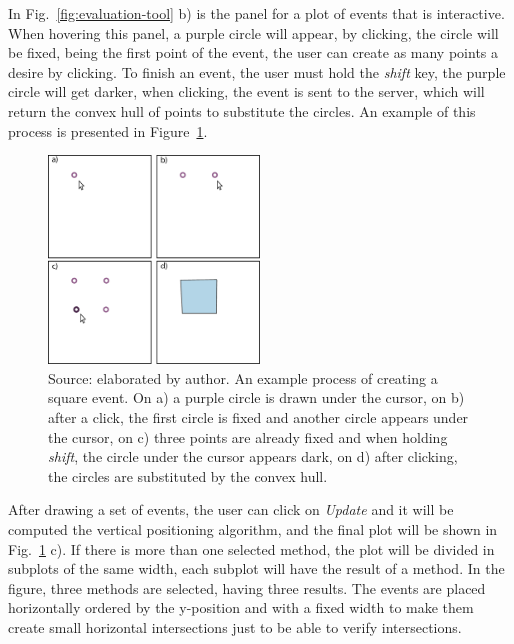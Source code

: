 In Fig.~\ref{fig:evaluation-tool} b) is the panel for a plot of events that is interactive. When hovering this panel, a purple circle will appear, by clicking, the circle will be fixed, being the first point of the event, the user can create as many points a desire by clicking. To finish an event, the user must hold the \textit{shift} key, the purple circle will get darker, when clicking, the event is sent to the server, which will return the convex hull of points to substitute the circles. 
%
An example of this process is presented in Figure~\ref{fig:evaluation-tool-draw}.

\begin{figure}
    \centering
    \includegraphics[width = 0.5\textwidth]{src/imgs/evaluation-tool-draw.pdf}
    \caption{Source: elaborated by author. An example process of creating a square event. On a) a purple circle is drawn under the cursor, on b) after a click, the first circle is fixed and another circle appears under the cursor, on c) three points are already fixed and when holding \textit{shift}, the circle under the cursor appears dark, on d) after clicking, the circles are substituted by the convex hull.}
    \label{fig:evaluation-tool-draw}
\end{figure}

After drawing a set of events, the user can click on \textit{Update} and it will be computed the vertical positioning algorithm, and the final plot will be shown in Fig.~\ref{fig:evaluation-tool-draw} c).
%
If there is more than one selected method, the plot will be divided in subplots of the same width, each subplot will have the result of a method. 
%
In the figure, three methods are selected, having three results.
%
The events are placed horizontally ordered by the y-position and with a fixed width to make them create small horizontal intersections just to be able to verify intersections.
